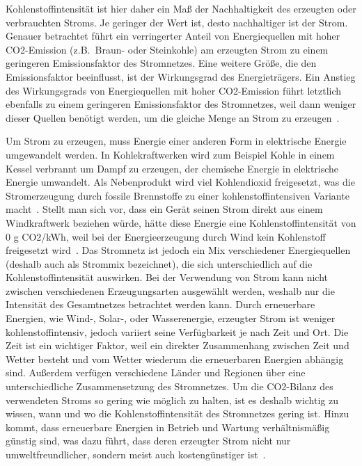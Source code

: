 Kohlenstoffintensität ist hier daher ein Maß der Nachhaltigkeit des erzeugten oder verbrauchten Stroms.
Je geringer der Wert ist, desto nachhaltiger ist der Strom.
Genauer betrachtet führt ein verringerter Anteil von Energiequellen mit hoher \ac{CO2}-Emission (z.B.\ Braun- oder Steinkohle) am erzeugten Strom zu einem geringeren Emissionsfaktor des Stromnetzes.
Eine weitere Größe, die den Emissionsfaktor beeinflusst, ist der Wirkungsgrad des Energieträgers.
Ein Anstieg des Wirkungsgrads von Energiequellen mit hoher \ac{CO2}-Emission führt letztlich ebenfalls zu einem geringeren Emissionsfaktor des Stromnetzes, weil dann weniger dieser Quellen benötigt werden, um die gleiche Menge an Strom zu erzeugen~\cite{Icha.2020}.

Um Strom zu erzeugen, muss Energie einer anderen Form in elektrische Energie umgewandelt werden.
In Kohlekraftwerken wird zum Beispiel Kohle in einem Kessel verbrannt um Dampf zu erzeugen, der chemische Energie in elektrische Energie umwandelt.
Als Nebenprodukt wird viel Kohlendioxid freigesetzt, was die Stromerzeugung durch fossile Brennstoffe zu einer kohlenstoffintensiven Variante macht~\cite{Currie.2024}.
Stellt man sich vor, dass ein Gerät seinen Strom direkt aus einem Windkraftwerk beziehen würde, hätte diese Energie eine Kohlenstoffintensität von 0 g \ac{CO2}/\ac{kWh}, weil bei der Energieerzeugung durch Wind kein Kohlenstoff freigesetzt wird~\cite{GreenSoftwareFoundation.2022}.
Das Stromnetz ist jedoch ein Mix verschiedener Energiequellen (deshalb auch als Strommix bezeichnet), die sich unterschiedlich auf die Kohlenstoffintensität auswirken.
Bei der Verwendung von Strom kann nicht zwischen verschiedenen Erzeugungsarten ausgewählt werden, weshalb nur die Intensität des Gesamtnetzes betrachtet werden kann.
Durch erneuerbare Energien, wie Wind-, Solar-, oder Wasserenergie, erzeugter Strom ist weniger kohlenstoffintensiv, jedoch variiert seine Verfügbarkeit je nach Zeit und Ort.
Die Zeit ist ein wichtiger Faktor, weil ein direkter Zusammenhang zwischen Zeit und Wetter besteht und vom Wetter wiederum die erneuerbaren Energien abhängig sind.
Außerdem verfügen verschiedene Länder und Regionen über eine unterschiedliche Zusammensetzung des Stromnetzes.
Um die \ac{CO2}-Bilanz des verwendeten Stroms so gering wie möglich zu halten, ist es deshalb wichtig zu wissen, wann und wo die Kohlenstoffintensität des Stromnetzes gering ist.
Hinzu kommt, dass erneuerbare Energien in Betrieb und Wartung verhältnismäßig günstig sind, was dazu führt, dass deren erzeugter Strom nicht nur umweltfreundlicher, sondern meist auch kostengünstiger ist~\cite{NationalGrid.20231106T13:28:05.000Z}.

